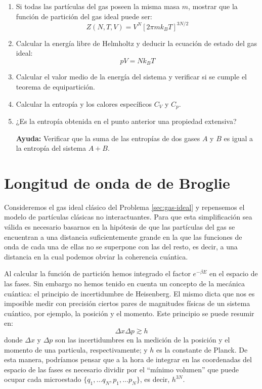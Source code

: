 \documentclass[a4paper,11pt]{article}
\begin{document}
\begin{enumerate}[label=(\alph*),
                  leftmargin=2\parindent,
                  rightmargin=2\parindent]

    \item{\label{item:gas-ideal-particion}
          Si todas las partículas del gas poseen la misma masa $m$,
          mostrar que la función de partición del gas ideal puede ser:
          $$ Z(N, T, V) = V^N \left[ 2\pi m k_B T \right]^{3N/2} $$
          }

    \item{Calcular la energía libre de Helmholtz y deducir la ecuación de
          estado del gas ideal:
          $$ pV = N k_B T $$
          }

    \item{Calcular el valor medio de la energía del sistema y
          verificar si se cumple el teorema de equipartición.
          }

    \item{Calcular la entropía y los calores específicos $C_V$ y $C_p$.
          }

    \item{¿Es la entropía obtenida en el punto anterior una propiedad
          extensiva?
          }

    {\small
    \textbf{Ayuda:} Verificar que la suma de las entropías de dos
    gases $A$ y $B$ es igual a la entropía del sistema $A + B$.
    }

\end{enumerate}


\section{Longitud de onda de de Broglie}
\label{sec:de-broglie}

Consideremos el gas ideal clásico del Problema \ref{sec:gas-ideal} y
repensemos el modelo de partículas clásicas no interactuantes. Para que esta
simplificación sea válida es necesario basarnos en la hipótesis de que las
partículas del gas se encuentran a una distancia suficientemente grande en la
que las funciones de onda de cada una de ellas no se superpone con las del
resto, es decir, a una distancia en la cual podemos obviar la coherencia
cuántica.

Al calcular la función de partición hemos integrado el factor
$e^{-\beta E}$ en el espacio de las fases. Sin embargo no hemos tenido
en cuenta un concepto de la mecánica cuántica: el principio de
incertidumbre de Heisenberg. El mismo dicta que nos es imposible medir
con precisión ciertos pares de magnitudes físicas de un sistema
cuántico, por ejemplo, la posición y el momento. Este principio se
puede resumir en:
$$ \Delta x \Delta p \gtrsim  h$$
donde $\Delta x$ y $\Delta p$ son las incertidumbres en la medición de
la posición y el momento de una particula, respectivamente; y $h$ es
la constante de Planck.
De esta manera, podríamos pensar que a la hora de integrar en las
coordenadas del espacio de las fases es necesario dividir por el
``mínimo volumen'' que puede ocupar cada microestado
$\{ q_1, \dots q_N, p_1, \dots p_N \}$, es decir, $h^{3N}$.
\end{document}
